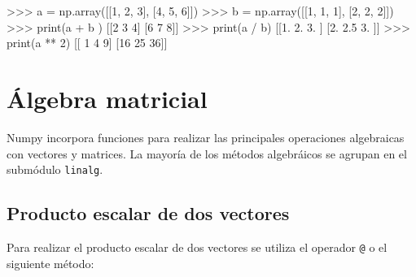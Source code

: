 \documentclass[
  spanish,
  a4paper,
]{scrreport}
\newenvironment{Shaded}{\begin{snugshade}}{\end{snugshade}}
\newcommand{\BuiltInTok}[1]{\textcolor[rgb]{0.00,0.23,0.31}{#1}}
\newcommand{\DecValTok}[1]{\textcolor[rgb]{0.68,0.00,0.00}{#1}}
\newcommand{\FloatTok}[1]{\textcolor[rgb]{0.68,0.00,0.00}{#1}}
\newcommand{\NormalTok}[1]{\textcolor[rgb]{0.00,0.23,0.31}{#1}}
\newcommand{\OperatorTok}[1]{\textcolor[rgb]{0.37,0.37,0.37}{#1}}
\begin{document}
\begin{Shaded}
\begin{Highlighting}[]
\OperatorTok{\textgreater{}\textgreater{}\textgreater{}}\NormalTok{ a }\OperatorTok{=}\NormalTok{ np.array([[}\DecValTok{1}\NormalTok{, }\DecValTok{2}\NormalTok{, }\DecValTok{3}\NormalTok{], [}\DecValTok{4}\NormalTok{, }\DecValTok{5}\NormalTok{, }\DecValTok{6}\NormalTok{]])}
\OperatorTok{\textgreater{}\textgreater{}\textgreater{}}\NormalTok{ b }\OperatorTok{=}\NormalTok{ np.array([[}\DecValTok{1}\NormalTok{, }\DecValTok{1}\NormalTok{, }\DecValTok{1}\NormalTok{], [}\DecValTok{2}\NormalTok{, }\DecValTok{2}\NormalTok{, }\DecValTok{2}\NormalTok{]])}
\OperatorTok{\textgreater{}\textgreater{}\textgreater{}} \BuiltInTok{print}\NormalTok{(a }\OperatorTok{+}\NormalTok{ b )}
\NormalTok{[[}\DecValTok{2} \DecValTok{3} \DecValTok{4}\NormalTok{]}
\NormalTok{ [}\DecValTok{6} \DecValTok{7} \DecValTok{8}\NormalTok{]]}
\OperatorTok{\textgreater{}\textgreater{}\textgreater{}} \BuiltInTok{print}\NormalTok{(a }\OperatorTok{/}\NormalTok{ b)}
\NormalTok{[[}\FloatTok{1.}  \FloatTok{2.}  \FloatTok{3.}\NormalTok{ ]}
\NormalTok{ [}\FloatTok{2.}  \FloatTok{2.5} \FloatTok{3.}\NormalTok{ ]]}
\OperatorTok{\textgreater{}\textgreater{}\textgreater{}} \BuiltInTok{print}\NormalTok{(a }\OperatorTok{**} \DecValTok{2}\NormalTok{)}
\NormalTok{[[ }\DecValTok{1}  \DecValTok{4}  \DecValTok{9}\NormalTok{]}
\NormalTok{ [}\DecValTok{16} \DecValTok{25} \DecValTok{36}\NormalTok{]]}
\end{Highlighting}
\end{Shaded}

\section{Álgebra matricial}\label{uxe1lgebra-matricial}

Numpy incorpora funciones para realizar las principales operaciones
algebraicas con vectores y matrices. La mayoría de los métodos
algebráicos se agrupan en el submódulo \texttt{linalg}.

\subsection{Producto escalar de dos
vectores}\label{producto-escalar-de-dos-vectores}

Para realizar el producto escalar de dos vectores se utiliza el operador
\texttt{@} o el siguiente método:
\end{document}
